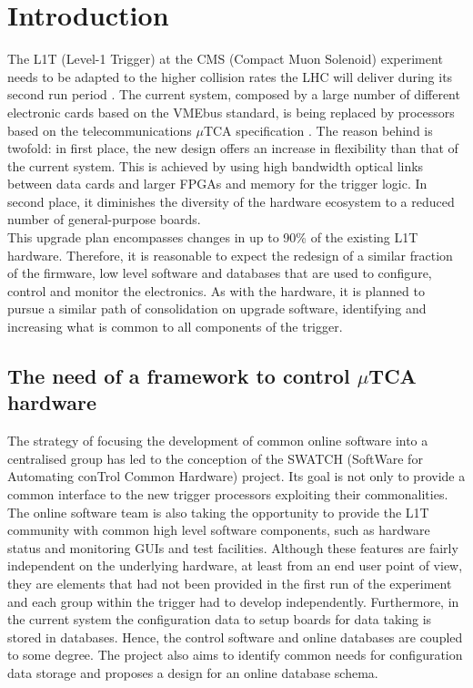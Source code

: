 \documentclass[a4paper]{jpconf}
\begin{document}
\section{Introduction}
The L1T (Level-1 Trigger) at the CMS (Compact Muon Solenoid) experiment needs to be adapted to the higher collision rates the LHC will deliver during its second run period \cite{cms_tdr}. The current system, composed by a large number of different electronic cards based on the VMEbus standard, is being replaced by processors based on the telecommunications $\mu$TCA specification \cite{utca_spec}. The reason behind is twofold: in first place, the new design offers an increase in flexibility than that of the current system. This is achieved by using high bandwidth optical links between data cards and larger FPGAs and memory for the trigger logic. In second place, it diminishes the diversity of the hardware ecosystem to a reduced number of general-purpose boards. \\
This upgrade plan encompasses changes in up to 90\% of the existing L1T hardware. Therefore, it is reasonable to expect the redesign of a similar fraction of the firmware, low level software and databases that are used to configure, control and monitor the electronics. As with the hardware, it is planned to pursue a similar path of consolidation on upgrade software, identifying and increasing what is common to all components of the trigger. 

\subsection{The need of a framework to control $\mu$TCA hardware}
The strategy of focusing the development of common online software into a centralised group has led to the conception of the SWATCH (SoftWare for Automating conTrol Common Hardware) project. Its goal is not only to provide a common interface to the new trigger processors exploiting their commonalities. The online software team is also taking the opportunity to provide the L1T community with common high level software components, such as hardware status and monitoring GUIs and test facilities. Although these features are fairly independent on the underlying hardware, at least from an end user point of view, they are elements that had not been provided in the first run of the experiment and each group within the trigger had to develop independently. Furthermore, in the current system the configuration data to setup boards for data taking is stored in databases. Hence, the control software and online databases are coupled to some degree. The project also aims to identify common needs for configuration data storage and proposes a design for an online database schema. 
\end{document}
